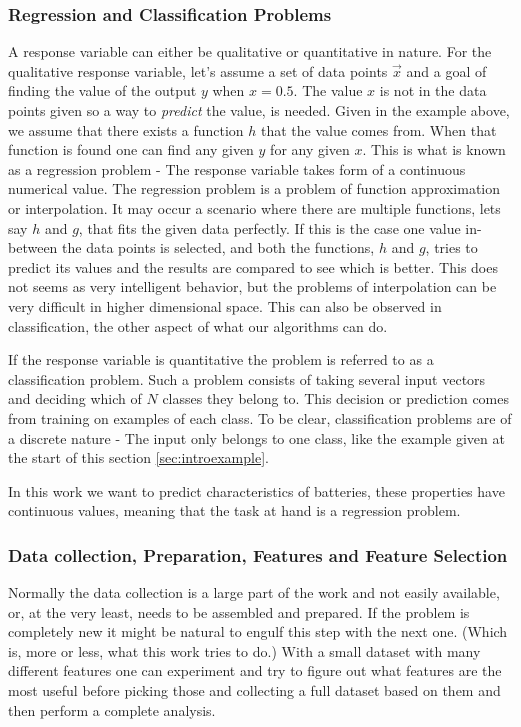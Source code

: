 	\subsubsection{Regression and Classification Problems}
		A response variable can either be qualitative or quantitative in nature. For the qualitative response variable, let's assume a set of data points $ \vec{x}$ and a goal of finding the value of the output $y$ when $x = 0.5$. The value $x $ is not in the data points given so a way to \textit{predict} the value, is needed. Given in the example above, we assume that there exists a function $h$ that the value comes from. When that function is found one can find any given $y$ for any given $x$. This is what is known as a regression problem - The response variable takes form of a continuous numerical value. The regression problem is a problem of function approximation or interpolation. It may occur a scenario where there are multiple functions, lets say $h$ and $g$, that fits the given data perfectly. If this is the case one value in-between the data points is selected, and both the functions, $h$ and $g$, tries to predict its values and the results are compared to see which is better.
	This does not seems as very intelligent behavior, but the problems of interpolation can be very difficult in higher dimensional space. This can also be observed in classification, the other aspect of what our algorithms can do.
	
	If the response variable is quantitative the problem is referred to as a classification problem. Such a problem consists of taking several input vectors and deciding which of $N$ classes they belong to. This decision or prediction comes from training on examples of each class. To be clear, classification problems are of a discrete nature - The input only belongs to one class, like the example given at the start of this section \ref{sec:introexample}.
	
	In this work we want to predict characteristics of batteries, these properties have continuous values, meaning that the task at hand is a regression problem.
	
	\subsubsection{Data collection, Preparation, Features and Feature Selection}
	
	Normally the data collection is a large part of the work and not easily available, or, at the very least, needs to be assembled and prepared. If the problem is completely new it might be natural to engulf this step with the next one. (Which is, more or less, what this work tries to do.) With a small dataset with many different features one can experiment and try to figure out what features are the most useful before picking those and collecting a full dataset based on them and then perform a complete analysis.
	
